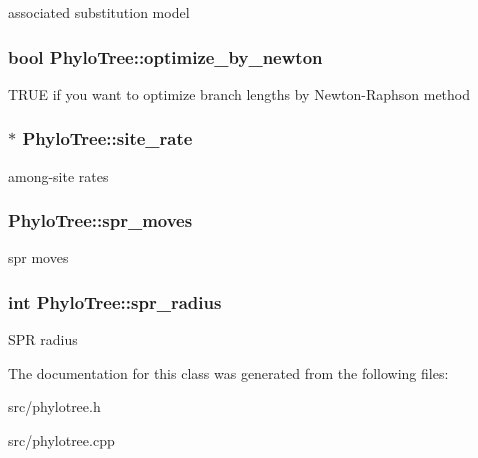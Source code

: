 \label{classPhyloTree_affd265bc9cd055d0f59bfda46c98387b}
associated substitution model \hypertarget{classPhyloTree_ab17482e0cf6b9ea6def40d2c49bf0f3a}{
\subsubsection[{optimize\_\-by\_\-newton}]{\setlength{\rightskip}{0pt plus 5cm}bool {\bf PhyloTree::optimize\_\-by\_\-newton}}}
\label{classPhyloTree_ab17482e0cf6b9ea6def40d2c49bf0f3a}
TRUE if you want to optimize branch lengths by Newton-\/Raphson method \hypertarget{classPhyloTree_a9b7513b9bfee50bcd6cbe97a87366c4d}{
\subsubsection[{site\_\-rate}]{$\ast$ {\bf PhyloTree::site\_\-rate}}}
\label{classPhyloTree_a9b7513b9bfee50bcd6cbe97a87366c4d}
among-\/site rates \hypertarget{classPhyloTree_a0ec867545e10bf1a45c938ed5c4a43f1}{
\subsubsection[{spr\_\-moves}]{ {\bf PhyloTree::spr\_\-moves}}}
\label{classPhyloTree_a0ec867545e10bf1a45c938ed5c4a43f1}
spr moves \hypertarget{classPhyloTree_a63a5b49b525b22534b525d7a35e663c7}{
\subsubsection[{spr\_\-radius}]{\setlength{\rightskip}{0pt plus 5cm}int {\bf PhyloTree::spr\_\-radius}}}
\label{classPhyloTree_a63a5b49b525b22534b525d7a35e663c7}
SPR radius 

The documentation for this class was generated from the following files:\begin{DoxyCompactItemize}
\item 
src/phylotree.h\item 
src/phylotree.cpp\end{DoxyCompactItemize}
